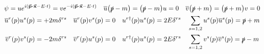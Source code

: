 \begin{gather*}
        \psi
        = ue^{i\qty(\va{p}\vdot\va{x} - E\cdot t)}
        = ve^{-i\qty(\va{p}\vdot\va{x} - E\cdot t)}
        \quad
        \overline{u}\qty(\slashed{p}-m)=\qty(\slashed{p}-m)u=0
        \quad
        \overline{v}\qty(\slashed{p}+m)=\qty(\slashed{p}+m)v=0
        \\
        \overline{u}^r(p)u^s(p) = +2m\delta^{rs}
        \quad
        \overline{u}^r(p)v^s(p) = 0
        \quad
        u^{r\dagger}(p)u^s(p) = 2E\delta^{rs}
        \quad
        \sum_{s=1,2}u^s(p)\overline{u}^s(p) = \slashed{p} + m
        \\
        \overline{v}^r(p)v^s(p) = -2m\delta^{rs}
        \quad
        \overline{v}^r(p)u^s(p) = 0
        \quad
        u^{r\dagger}(p)u^s(p) = 2E\delta^{rs}
        \quad
        \sum_{s=1,2}v^s(p)\overline{v}^s(p) = \slashed{p} - m
\end{gather*}
